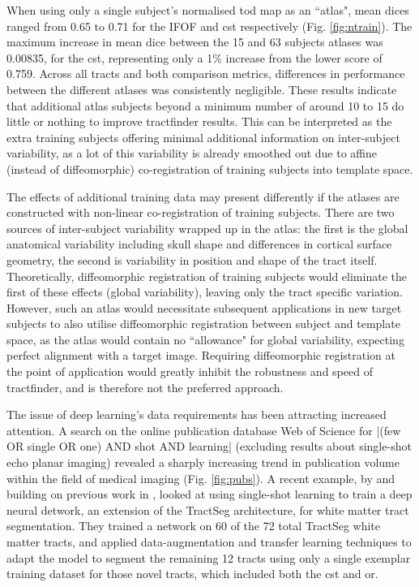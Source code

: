 When using only a single subject's normalised \gls{tod} map as an ``atlas", mean \gls{dice}s ranged from 0.65 to 0.71 for the IFOF and \gls{cst} respectively (Fig. \ref{fig:ntrain}).
The maximum increase in mean \gls{dice} between the 15 and 63 subjects atlases was 0.00835, for the \gls{cst}, representing only a 1\% increase from the lower score of 0.759.
Across all tracts and both comparison metrics, differences in performance between the different atlases was consistently negligible.
These results indicate that additional atlas subjects beyond a minimum number of around 10 to 15 do little or nothing to improve tractfinder results.
This can be interpreted as the extra training subjects offering minimal additional information on inter-subject variability, as a lot of this variability is already smoothed out due to affine (instead of diffeomorphic) co-registration of training subjects into template space.

The effects of additional training data may present differently if the atlases are constructed with non-linear co-registration of training subjects. %
There are two sources of inter-subject variability wrapped up in the atlas: the first is the global anatomical variability including skull shape and differences in cortical surface geometry, the second is variability in position and shape of the tract itself.
Theoretically, diffeomorphic registration of training subjects would eliminate the first of these effects (global variability), leaving only the tract specific variation.
However, such an atlas would necessitate subsequent applications in new target subjects to also utilise diffeomorphic registration between subject and template space, as the atlas would contain no ``allowance" for global variability, expecting perfect alignment with a target image.
Requiring diffeomorphic registration at the point of application would greatly inhibit the robustness and speed of tractfinder, and is therefore not the preferred approach.

The issue of deep learning's data requirements has been attracting increased attention.
A search on the online publication database Web of Science for \spverb|(few OR single OR one) AND shot AND learning|  (excluding results about single-shot echo planar imaging) revealed a sharply increasing trend in publication volume within the field of medical imaging (Fig. \ref{fig:pubs}).
A recent example, by \textcite{Liu2023a} and building on previous work in \textcite{Lu2021}, looked at using single-shot learning to train a deep neural detwork, an extension of the TractSeg architecture, for white matter tract segmentation.
They trained a network on 60 of the 72 total TractSeg white matter tracts, and applied data-augmentation and transfer learning techniques to adapt the model to segment the remaining 12 tracts using only a single exemplar training dataset for those novel tracts, which included both the \gls{cst} and \gls{or}.

